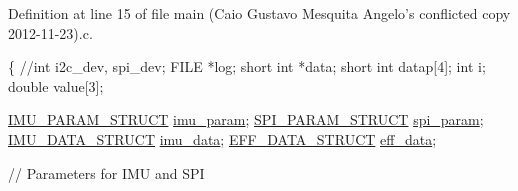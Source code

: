 Definition at line 15 of file main (\-Caio Gustavo Mesquita Angelo's conflicted copy 2012-\/11-\/23).\-c.


\begin{DoxyCode}
\{
  \textcolor{comment}{//int i2c\_dev, spi\_dev;}
  FILE *log;
  \textcolor{keywordtype}{short} \textcolor{keywordtype}{int} *data;
  \textcolor{keywordtype}{short} \textcolor{keywordtype}{int} datap[4];
  \textcolor{keywordtype}{int} i;
  \textcolor{keywordtype}{double} value[3];
  
  \hyperlink{structIMU__PARAM__STRUCT}{IMU\_PARAM\_STRUCT} \hyperlink{main2_01_07C_xC3_xB3pia_01em_01conflito_01de_01Caio_01Gustavo_01Mesquita_01Angelo_012013-04-28_08_8c_a9c6b2109fb9402446f92995db60951b5}{imu\_param};
  \hyperlink{structSPI__PARAM__STRUCT}{SPI\_PARAM\_STRUCT} \hyperlink{main2_01_07C_xC3_xB3pia_01em_01conflito_01de_01Caio_01Gustavo_01Mesquita_01Angelo_012013-04-28_08_8c_adec2468b88cf50b20e5cf399a3b7e994}{spi\_param};
  \hyperlink{structIMU__DATA__STRUCT}{IMU\_DATA\_STRUCT} \hyperlink{main2_01_07C_xC3_xB3pia_01em_01conflito_01de_01Caio_01Gustavo_01Mesquita_01Angelo_012013-04-28_08_8c_a3cfea12cbe9ca7f1681c950e4cd68606}{imu\_data};
  \hyperlink{structEFF__DATA__STRUCT}{EFF\_DATA\_STRUCT} \hyperlink{main2_01_07C_xC3_xB3pia_01em_01conflito_01de_01Caio_01Gustavo_01Mesquita_01Angelo_012013-04-28_08_8c_a5650ece8c3a277c7f158d75ae65265fa}{eff\_data};
  
\textcolor{comment}{// Parameters for IMU and SPI}


\end{DoxyCode}
